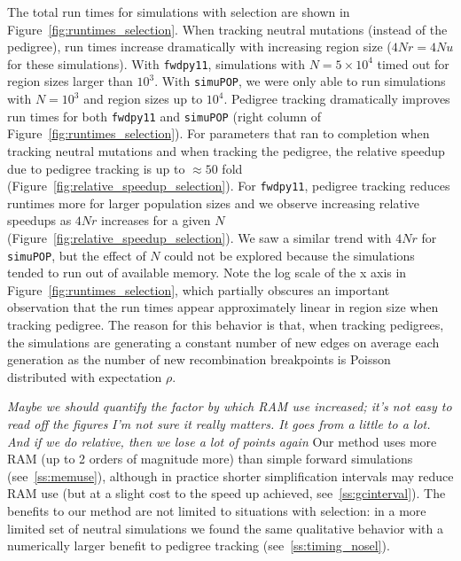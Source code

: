 \documentclass{article}
\newcommand{\simupop}{\texttt{simuPOP}}
\newcommand{\fwdpy}{\texttt{fwdpy11}}
\newcommand{\krt}[1]{{\em \color{green} #1}}
\newcommand{\jda}[1]{{\em \color{cyan} #1}}
\begin{document}


The total run times for simulations with selection are shown in Figure~\ref{fig:runtimes_selection}.  When tracking
neutral mutations (instead of the pedigree), run times increase dramatically with increasing region size ($4Nr = 4Nu$ for
these simulations).  With \fwdpy{}, simulations with $N=5 \times 10^4$ timed out for region sizes larger than $10^3$.
With \simupop{}, we were only able to run simulations with $N=10^3$ and region sizes up to $10^4$.  Pedigree tracking
dramatically improves run times for both \fwdpy{} and \simupop{} (right column of Figure~\ref{fig:runtimes_selection}).  For parameters that ran to completion when tracking neutral mutations and when tracking
the pedigree, the relative speedup due to pedigree tracking is up to $\approx 50$ fold
(Figure~\ref{fig:relative_speedup_selection}).  For \fwdpy{}, pedigree tracking reduces runtimes more for larger
population sizes and we observe increasing relative speedups as $4Nr$ increases for a given $N$
(Figure~\ref{fig:relative_speedup_selection}).  We saw a similar trend with $4Nr$ for \simupop{}, but the effect of $N$
could not be explored because the simulations tended to run out of available memory.
  Note the log scale of the x axis in Figure~\ref{fig:runtimes_selection}, which
partially obscures an important observation that the run times appear approximately linear in region size when tracking
pedigree.  The reason for this behavior is that, when tracking pedigrees, the simulations are generating a constant number of new edges on
average
each generation as the number of new recombination breakpoints is Poisson distributed with expectation $\rho$.

\jda{Maybe we should quantify the factor by which RAM use increased; it's not
	easy to read off the figures}
\krt{I'm not sure it really matters.  It goes from a little to a lot.  And if we do relative, then we lose a lot of
    points again}
Our method uses more RAM (up to 2 orders of magnitude more) than simple forward simulations (see~\ref{ss:memuse}),
although in practice shorter simplification intervals may reduce RAM use
(but at a slight cost to the speed up achieved, see~\ref{ss:gcinterval}).
The benefits to our method are not limited to situations with selection:
in a more limited set of neutral simulations we found the same qualitative
behavior with a numerically larger benefit to pedigree tracking (see~\ref{ss:timing_nosel}).
\end{document}
